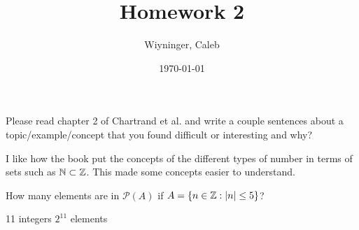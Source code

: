 \documentclass{homework}
\author{Wiyninger, Caleb}  %
\date{\today}  %
\title{Homework 2}
\begin{document}
 \maketitle

\question Please read chapter 2 of Chartrand et al. and write a couple sentences about a topic/example/concept that you found difficult or interesting and why?

\begin{sol}
    I like how the book put the concepts of the different types of number in terms of sets such as $\mathbb{N} \subset \mathbb{Z}$. This made some concepts easier to understand.
\end{sol}

\question How many elements are in $\mathcal{P}(A)$ if $A = \{n \in \mathbb{Z}: |n| \leq 5\}$?

\begin{sol}
11 integers \smallbreak
$2^{11}$ elements
\end{sol}
\end{document}
